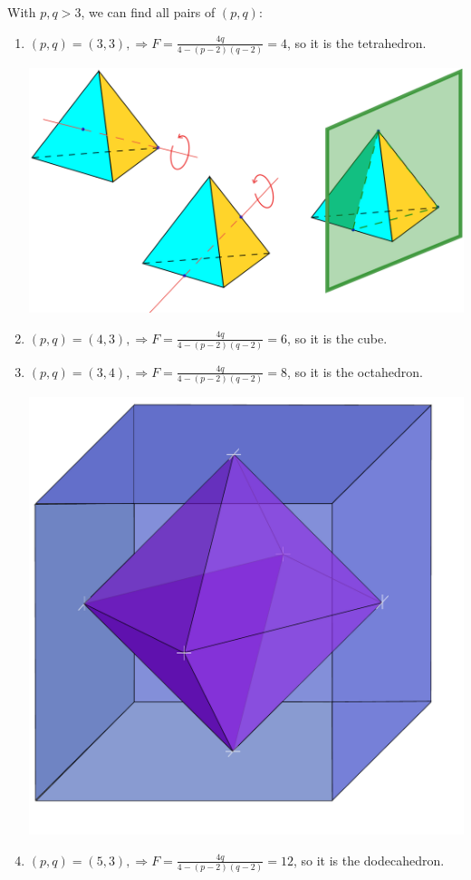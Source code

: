 \documentclass[]{ctexart}
\begin{document}
		With $p,q>3$, we can find all pairs of $(p,q)$:
			\begin{enumerate}
				\item $ (p,q)=(3,3), \Rightarrow F=\frac{4q}{4-(p-2)(q-2)}=4$, so it is the tetrahedron. 
				
				\begin{center}
					\includegraphics[scale=0.2]{Symmetries_of_the_tetrahedron.pdf}
				\end{center}
				\item $ (p,q)=(4,3), \Rightarrow F=\frac{4q}{4-(p-2)(q-2)}=6$, so it is the cube. 
				\item $ (p,q)=(3,4), \Rightarrow F=\frac{4q}{4-(p-2)(q-2)}=8$, so it is the octahedron.
				
				\begin{center}
					\includegraphics[scale=0.3]{Dual_Cube-Octahedron_1.pdf}
				\end{center}
				\item  $ (p,q)=(5,3), \Rightarrow F=\frac{4q}{4-(p-2)(q-2)}=12$, so it is the dodecahedron.
				

\end{enumerate}
\end{document}

